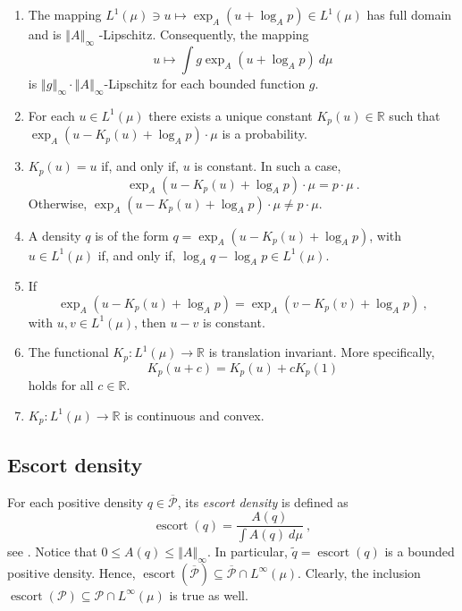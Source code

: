 \documentclass[graybox]{svmult}
\newcommand{\escortof}[1]{\operatorname{escort}\left(#1\right)}
\newcommand{\normat}[2]{\left\Vert#2\right\Vert_{#1}}
\begin{document}
\begin{proposition}\label{prop:Aexp}
\begin{enumerate}
\item The mapping $L^{1}(\mu )\ni u\mapsto \exp _{A}(u+\log _{A}p)\in
L^{1}(\mu )$ has full domain and is $\left\Vert A\right\Vert _{\infty }$
-Lipschitz. Consequently, the mapping 
\begin{equation*}
u\mapsto \int g\exp _{A}(u+\log _{A}p)\ d\mu
\end{equation*}
is $\left\Vert g\right\Vert _{\infty }\cdot \left\Vert A\right\Vert _{\infty
}$-Lipschitz for each bounded function $g$.

\item For each $u\in L^{1}(\mu )$ there exists a unique constant $
K_{p}(u)\in \mathbb{R}$ such that $\exp _{A}(u-K_{p}(u)+\log _{A}p)\cdot \mu 
$ is a probability.

\item $K_{p}(u)=u$ if, and only if, $u$ is constant. In such a
case, 
\begin{equation*}
\exp _{A}(u-K_{p}(u)+\log _{A}p)\cdot \mu =p\cdot \mu \ .
\end{equation*}
Otherwise, $\exp _{A}(u-K_{p}(u)+\log _{A}p)\cdot \mu \neq p\cdot \mu $.

\item\label{item:Aexp4} A density $q$ is of the form $q=\exp _{A}(u-K_p(u)+\log_A p)$, with $
u\in L^{1}(\mu )$ if, and only if, $\log _{A}q - \log_A p \in L^1(\mu)$.

\item If 
\begin{equation*}
\exp _{A}(u-K_{p}(u)+\log _{A}p)=\exp _{A}(v-K_{p}(v)+\log _{A}p)\ ,
\end{equation*}
 with $u,v\in L^{1}(\mu )$, then $u-v$ is constant.

\item The functional $K_{p}\colon L^{1}(\mu )\rightarrow \mathbb{R}$ is
translation invariant. More specifically,
\begin{equation*}
K_{p}(u+c)=K_{p}(u)+cK_{p}(1)
\end{equation*}
holds for all $c\in \mathbb{R}$.

\item $K_{p}:L^{1}(\mu )\rightarrow \mathbb{R}$ is continuous and convex.
\end{enumerate}
\end{proposition}
\subsection{Escort density}
\label{sec:escortdensity}
For each positive density $q\in \overline{\mathcal P}$, its \emph{escort density} is defined as
\begin{equation*}
  \escortof q = \frac{A(q)}{\int A(q)\ d\mu} \ ,
\end{equation*}
see \cite{naudts:2011GTh}. Notice that $0 \le A(q)\le \normat \infty {A}$. In particular, $\widetilde q = \escortof q$ is a bounded positive density. Hence, $\escortof {\overline{\mathcal P}}\subseteq  \overline{\mathcal P}\cap L^{\infty}(\mu)$. Clearly, the inclusion $\escortof{\mathcal P}\subseteq \mathcal P\cap L^{\infty}(\mu)$ is true as well. 
\end{document}
